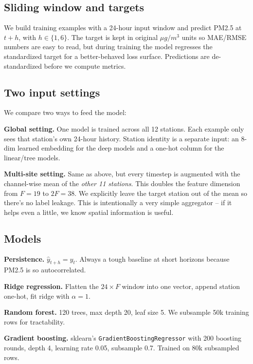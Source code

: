 \documentclass{article}
\begin{document}
\subsection{Sliding window and targets}

We build training examples with a 24-hour input window and predict
PM2.5 at $t + h$, with $h \in \{1, 6\}$. The target is kept in original
$\mu g/m^3$ units so MAE/RMSE numbers are easy to read, but during
training the model regresses the standardized target for a
better-behaved loss surface. Predictions are de-standardized before we
compute metrics.

\subsection{Two input settings}

We compare two ways to feed the model:

\textbf{Global setting.} One model is trained across all 12 stations.
Each example only sees that station's own 24-hour history. Station
identity is a separate input: an 8-dim learned embedding for the deep
models and a one-hot column for the linear/tree models.

\textbf{Multi-site setting.} Same as above, but every timestep is
augmented with the channel-wise mean of the \emph{other 11 stations}.
This doubles the feature dimension from $F=19$ to $2F=38$. We
explicitly leave the target station out of the mean so there's no label
leakage. This is intentionally a very simple aggregator -- if it helps
even a little, we know spatial information is useful.

\subsection{Models}

\textbf{Persistence.} $\hat y_{t+h} = y_t$. Always a tough baseline at
short horizons because PM2.5 is so autocorrelated.

\textbf{Ridge regression.} Flatten the $24 \times F$ window into one
vector, append station one-hot, fit ridge with $\alpha = 1$.

\textbf{Random forest.} 120 trees, max depth 20, leaf size 5.
We subsample 50k training rows for tractability.

\textbf{Gradient boosting.} sklearn's \texttt{GradientBoostingRegressor}
with 200 boosting rounds, depth 4, learning rate 0.05, subsample 0.7.
Trained on 80k subsampled rows.
\end{document}
